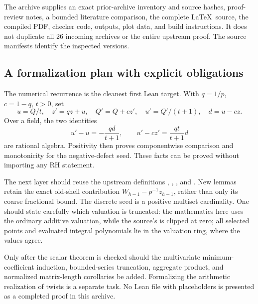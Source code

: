 The archive supplies an exact prior-archive inventory and source hashes,
proof-review notes, a bounded literature comparison, the complete \LaTeX\
source, the compiled PDF, checker code, outputs, plot data, and build
instructions. It does not duplicate all 26 incoming archives or the
entire upstream proof. The source manifests identify the inspected versions.

\subsection{A formalization plan with explicit obligations}

The numerical recurrence is the cleanest first Lean target. With
\(q=1/p\), \(c=1-q\), \(t>0\), set
\[
 u=Q/t,\quad z'=qz+u,\quad Q'=Q+cz',\quad
 u'=Q'/(t+1),\quad d=u-cz.
\]
Over a field, the two identities
\[
 u'-u=-\frac{qd}{t+1},\qquad
 u'-cz'=\frac{qt}{t+1}d
\]
are rational algebra. Positivity then proves componentwise comparison
and monotonicity for the negative-defect seed. These facts can be proved
without importing any RH statement.

The next layer should reuse the upstream definitions
, , , and
. New lemmas retain the exact
old-shell contribution \(W_{h-1}-p^{-1}z_{h-1}\), rather than only its
coarse fractional bound. The discrete seed is a positive multiset
cardinality. One should state carefully which valuation is truncated:
the mathematics here uses the ordinary additive valuation, while
the source's \src{ellVal} is clipped at zero; all selected points and
evaluated integral polynomials lie in the valuation ring, where the
values agree.

Only after the scalar theorem is checked should the multivariate
minimum-coefficient induction, bounded-series truncation, aggregate
product, and normalized matrix-length corollaries be added. Formalizing
the arithmetic realization of twists is a separate task. No Lean file
with placeholders is presented as a completed proof in this archive.

